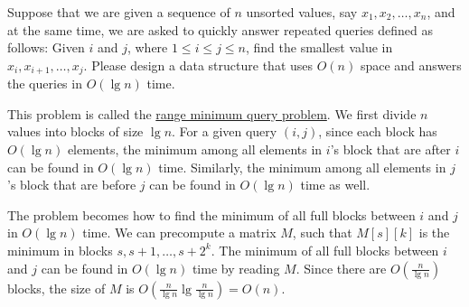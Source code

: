 \begin{Exercise}[title={Range minimum query problem},origin={NCTU BIOINFO 100},difficulty=1]
Suppose that we are given a sequence of $n$ unsorted values, say $x_1, x_2, \dots, x_n$, and at the same time, we are asked to quickly answer repeated queries defined as follows: Given $i$ and $j$, where $1 \leq i \leq j \leq n$, find the smallest value in $x_i, x_{i+1}, \dots, x_j$. Please design a data structure that uses $O(n)$ space and answers the queries in $O(\lg n)$ time.
\end{Exercise}
\begin{Answer}
This problem is called the \href{https://en.wikipedia.org/wiki/Range_minimum_query}{range minimum query problem}. 
We first divide $n$ values into blocks of size $\lg n$.
For a given query $(i, j)$, since each block has $O(\lg n)$ elements, the minimum among all elements in $i$'s block that are after $i$ can be found in $O(\lg n)$ time.
Similarly, the minimum among all elements in $j$'s block that are before $j$ can be found in $O(\lg n)$ time as well.

The problem becomes how to find the minimum of all full blocks between $i$ and $j$ in $O(\lg n)$ time.
We can precompute a matrix $M$, such that $M[s][k]$ is the minimum in blocks $s, s + 1, \dots, s + 2^k$.
The minimum of all full blocks between $i$ and $j$ can be found in $O(\lg n)$ time by reading $M$.
Since there are $O(\frac{n}{\lg n})$ blocks, the size of $M$ is $O(\frac{n}{\lg n} \lg \frac{n}{\lg n}) = O(n)$.
\end{Answer}

\printbibliography[heading=subbibliography]

